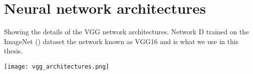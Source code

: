 \chapter{Neural network architectures}

\begin{table}
\caption[vgg architectures]{Showing the details of the VGG network architectures. Network D trained on the ImageNet (\cite{Russakovsky2015}) dataset the network known as  VGG16 and is what we use in this thesis.}\label{tab:vgg}
\texttt{[image: vgg\_architectures.png]}
\end{table}
